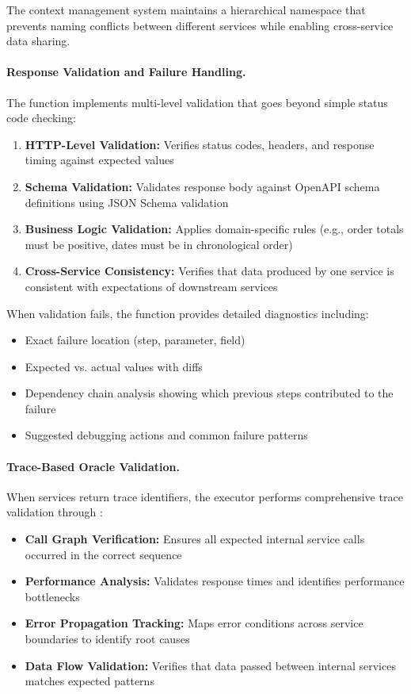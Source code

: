 \documentclass[conference]{IEEEtran}
\begin{document}
The context management system maintains a hierarchical namespace that
prevents naming conflicts between different services while enabling
cross-service data sharing.

\paragraph{Response Validation and Failure Handling.}
The  function implements multi-level
validation that goes beyond simple status code checking:

\begin{enumerate}[leftmargin=*]
  \item \textbf{HTTP-Level Validation:} Verifies status codes,
        headers, and response timing against expected values
  \item \textbf{Schema Validation:} Validates response body against
        OpenAPI schema definitions using JSON Schema validation
  \item \textbf{Business Logic Validation:} Applies domain-specific
        rules (e.g., order totals must be positive, dates must be
        in chronological order)
  \item \textbf{Cross-Service Consistency:} Verifies that data
        produced by one service is consistent with expectations
        of downstream services
\end{enumerate}

When validation fails, the  function provides
detailed diagnostics including:
\begin{itemize}[leftmargin=*]
  \item Exact failure location (step, parameter, field)
  \item Expected vs. actual values with diffs
  \item Dependency chain analysis showing which previous steps
        contributed to the failure
  \item Suggested debugging actions and common failure patterns
\end{itemize}

\paragraph{Trace-Based Oracle Validation.}
When services return trace identifiers, the executor performs
comprehensive trace validation through :

\begin{itemize}[leftmargin=*]
  \item \textbf{Call Graph Verification:} Ensures all expected
        internal service calls occurred in the correct sequence
  \item \textbf{Performance Analysis:} Validates response times
        and identifies performance bottlenecks
  \item \textbf{Error Propagation Tracking:} Maps error conditions
        across service boundaries to identify root causes
  \item \textbf{Data Flow Validation:} Verifies that data passed
        between internal services matches expected patterns
\end{itemize}
\end{document}
